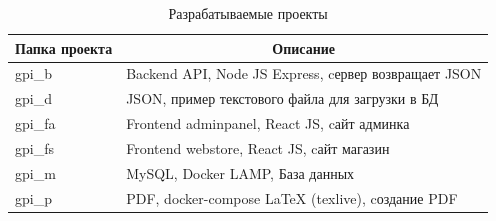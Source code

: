 \begin{table}[!h]
    \centering
    \caption{Разрабатываемые проекты}
    \begin{tabular}{|p{4cm}|p{12cm}|}

                                                                                       \hline
\multicolumn{1}{|c|}{\textbf{Папка проекта}}& \multicolumn{1}{c|}{\textbf{Описание}}\\ \hline
gpi\_b  & Backend API, Node JS Express, cервер возвращает JSON                      \\ \hline 
gpi\_d  & JSON, пример текстового файла для загрузки в БД                           \\ \hline  
gpi\_fa & Frontend adminpanel, React JS, cайт админка                               \\ \hline  
gpi\_fs & Frontend webstore, React JS, cайт магазин                                 \\ \hline
gpi\_m  & MySQL, Docker LAMP, База данных                                           \\ \hline
gpi\_p  & PDF, docker-compose LaTeX (texlive), cоздание PDF                         \\ \hline

    \end{tabular}
\end{table}

\newpage

